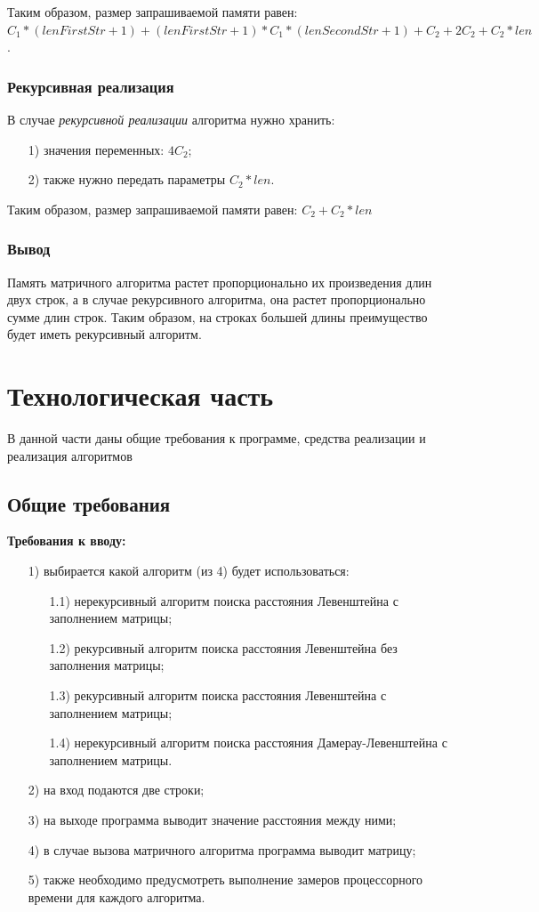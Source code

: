\documentclass[12pt]{report}
\begin{document}
	\noindent Таким образом, размер запрашиваемой памяти равен: $C_{1} * (lenFirstStr + 1) + (lenFirstStr + 1) * C_{1} * (lenSecondStr + 1) + C_{2} + 2C_{2} + C_{2} * len$.
	
	\subsection{Рекурсивная реализация}
	В случае \textit{рекурсивной реализации} алгоритма нужно хранить:
	\begin{enumerate}
		\item[1)] значения переменных: $4C_{2}$;
		\item[2)] также нужно передать параметры $C_{2} * len$.
	\end{enumerate}
	
	\noindent Таким образом, размер запрашиваемой памяти равен:
	$C_{2} + C_{2} * len$
	
	\subsection{Вывод}
	Память матричного алгоритма растет пропорционально их произведения длин двух строк, а в случае рекурсивного алгоритма, она растет пропорционально сумме длин строк. Таким образом, на строках большей длины преимущество будет иметь рекурсивный алгоритм.
	
	
	\newpage
	\chapter{Технологическая часть}
	В данной части даны общие требования к программе, средства реализации и реализация алгоритмов
	\section{Общие требования}
	\noindent\textbf{Требования к вводу:}
	\begin{enumerate}
		\item[1)] выбирается какой алгоритм (из 4) будет использоваться: 
		\begin{enumerate}
			\item[1.1)] нерекурсивный алгоритм поиска расстояния Левенштейна с заполнением матрицы;
			\item[1.2)] рекурсивный алгоритм поиска расстояния Левенштейна без заполнения матрицы;
			\item[1.3)] рекурсивный алгоритм поиска расстояния Левенштейна с заполнением матрицы;
			\item[1.4)] нерекурсивный алгоритм поиска расстояния Дамерау-Левенштейна с заполнением матрицы.
		\end{enumerate}
		\item[2)] на вход подаются две строки;
		\item[3)] на выходе программа выводит значение расстояния между ними;
		\item[4)] в случае вызова матричного алгоритма программа выводит матрицу;
		\item[5)] также необходимо предусмотреть выполнение замеров процессорного времени для каждого алгоритма.
	\end{enumerate}
	
\end{document}
